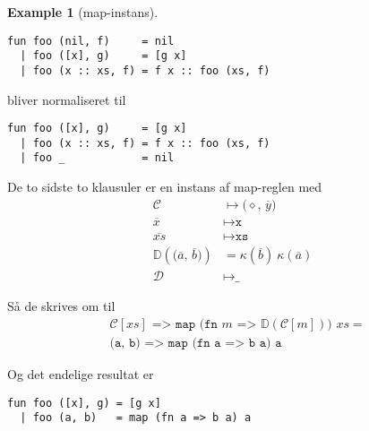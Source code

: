 \documentclass[oneside]{memoir}
\theoremstyle{definition}
\newtheorem{example}{Example}
\begin{document}
\begin{example}[\textsf{map}-instans]\
\begin{verbatim}
fun foo (nil, f)     = nil
  | foo ([x], g)     = [g x]
  | foo (x :: xs, f) = f x :: foo (xs, f)
\end{verbatim}

bliver normaliseret til

\begin{verbatim}
fun foo ([x], g)     = [g x]
  | foo (x :: xs, f) = f x :: foo (xs, f)
  | foo _            = nil
\end{verbatim}

De to sidste to klausuler er en instans af \textsf{map}-reglen med
\begin{align}
\mathcal{C} &\mapsto \texttt{($\diamond$, $\overline{y}$)}\\
\overline{x} &\mapsto \texttt{x}\\
\overline{xs} &\mapsto \texttt{xs}\\
\mathbb{D}(\texttt{($\overline{a}$, $\overline{b}$)}) &= \kappa(\overline{b})\
\kappa(\overline{a})\\
\mathcal{D} &\mapsto \texttt{\_}
\end{align}

Så de skrives om til
  \begin{align}
    &\texttt{$\mathcal{C}[xs]$ => map (fn $m$ =>
      $\mathbb{D}(\mathcal{C}[m])$) $xs$} =\\
    &\texttt{(a, b) => map (fn a => b a) a}
  \end{align}

Og det endelige resultat er

\begin{verbatim}
fun foo ([x], g) = [g x]
  | foo (a, b)   = map (fn a => b a) a
\end{verbatim}

\end{example}
\end{document}
